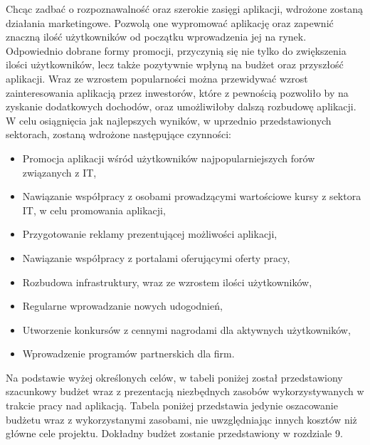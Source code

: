 \documentclass[12pt,a4paper]{article}
\begin{document}
Chcąc zadbać o rozpoznawalność oraz szerokie zasięgi aplikacji, wdrożone zostaną działania marketingowe. Pozwolą one wypromować aplikację oraz zapewnić znaczną ilość użytkowników od początku wprowadzenia jej na rynek. Odpowiednio dobrane formy promocji, przyczynią się nie tylko do zwiększenia ilości użytkowników, lecz także pozytywnie wpłyną na budżet oraz przyszłość aplikacji. Wraz ze wzrostem popularności można przewidywać wzrost zainteresowania aplikacją przez inwestorów, które z pewnością pozwoliło by na zyskanie dodatkowych dochodów, oraz umożliwiłoby dalszą rozbudowę aplikacji. W celu osiągnięcia jak najlepszych wyników, w uprzednio przedstawionych sektorach, zostaną wdrożone następujące czynności: 
\begin{itemize}
    \item Promocja aplikacji wśród użytkowników najpopularniejszych forów związanych z IT, 
    \item Nawiązanie współpracy z osobami prowadzącymi wartościowe kursy z sektora IT, w celu promowania aplikacji, 
    \item Przygotowanie reklamy prezentującej możliwości aplikacji, 
    \item Nawiązanie współpracy z portalami oferującymi oferty pracy, 
    \item Rozbudowa infrastruktury, wraz ze wzrostem ilości użytkowników, 
    \item Regularne wprowadzanie nowych udogodnień, 
    \item Utworzenie konkursów z cennymi nagrodami dla aktywnych użytkowników, 
    \item Wprowadzenie programów partnerskich dla firm.
\end{itemize}

Na podstawie wyżej określonych celów, w tabeli poniżej został przedstawiony szacunkowy budżet wraz z prezentacją niezbędnych zasobów wykorzystywanych w trakcie pracy nad aplikacją. Tabela poniżej przedstawia jedynie oszacowanie budżetu wraz z wykorzystanymi zasobami, nie uwzględniając innych kosztów niż główne cele projektu. Dokładny budżet zostanie przedstawiony w rozdziale 9.
\end{document}
